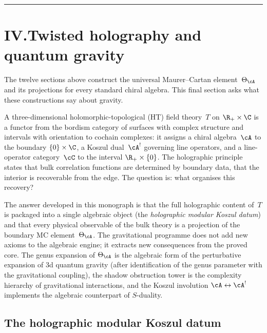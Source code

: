
\bigskip
\begin{center}
\rule{0.6\textwidth}{0.4pt}
\end{center}
\bigskip

\section*{IV.\quad Twisted holography and quantum gravity}

\noindent
The twelve sections above construct the universal Maurer--Cartan
element~$\Theta_\cA$ and its projections for every standard
chiral algebra. This final section asks what these constructions
say about gravity.

A three-dimensional holomorphic-topological (HT) field theory~$T$
on $\R_+\times\C$ is a functor from the bordism category of
surfaces with complex structure and intervals with orientation to
cochain complexes: it assigns a chiral algebra~$\cA$ to the
boundary $\{0\}\times\C$, a Koszul dual~$\cA^!$ governing line
operators, and a line-operator category~$\cC$ to the interval
$\R_+\times\{0\}$. The holographic principle states that bulk
correlation functions are determined by boundary data, that the
interior is recoverable from the edge. The question is: what
organises this recovery?

The answer developed in this monograph is that the full
holographic content of~$T$ is packaged into a single algebraic
object (the \emph{holographic modular Koszul datum}) and that
every physical observable of the bulk theory is a projection
of the boundary MC element~$\Theta_\cA$. The gravitational programme
does not add new axioms to the algebraic engine; it extracts new
consequences from the proved core. The genus expansion of
$\Theta_\cA$ is the algebraic form of the perturbative expansion
of 3d quantum gravity (after identification of the genus
parameter with the gravitational coupling), the shadow obstruction
tower is the complexity hierarchy of gravitational interactions,
and the Koszul involution $\cA\leftrightarrow\cA^!$ implements
the algebraic counterpart of $S$-duality.

\subsection*{The holographic modular Koszul datum}

